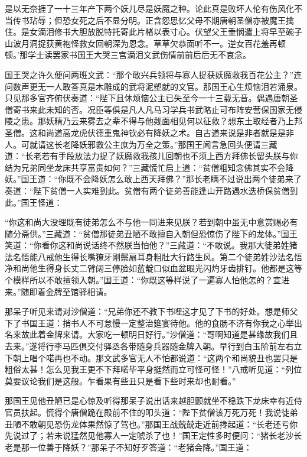 \documentclass[12pt,UTF8]{ctexbook}
\begin{document}
是以无奈捱了一十三年产下两个妖儿尽是妖魔之种。论此真是败坏人伦有伤风化不当传书玷辱；但恐女死之后不显分明。正含怨思忆父母不期唐朝圣僧亦被魔王擒住。是女滴泪修书大胆放脱特托寄此片楮以表寸心。伏望父王垂悯遣上将早至碗子山波月洞捉获黄袍怪救女回朝深为恩念。草草欠恭面听不一。逆女百花羞再顿顿。’那学士读罢家书国王大哭三宫滴泪文武伤情前前后后无不哀念。

国王哭之许久便问两班文武：“那个敢兴兵领将与寡人捉获妖魔救我百花公主？”连问数声更无一人敢答真是木雕成的武将泥塑就的文官。那国王心生烦恼泪若涌泉。只见那多官齐俯伏奏道：“陛下且休烦恼公主已失至今一十三载无音。偶遇唐朝圣僧寄书来此未知的否。况臣等俱是凡人凡马习学兵书武略止可布阵安营保国家无侵陵之患。那妖精乃云来雾去之辈不得与他觌面相见何以征救？想东土取经者乃上邦圣僧。这和尚道高龙虎伏德重鬼神钦必有降妖之术。自古道来说是非者就是是非人。可就请这长老降妖邪救公主庶为万全之策。”那国王闻言急回头便请三藏道：“长老若有手段放法力捉了妖魔救我孩儿回朝也不须上西方拜佛长留头朕与你结为兄弟同坐龙床共享富贵如何？”三藏慌忙启上道：“贫僧粗知念佛其实不会降妖。”国王道：“你既不会降妖怎么敢上西天拜佛？”那长老瞒不过说出两个徒弟来了奏道：“陛下贫僧一人实难到此。贫僧有两个徒弟善能逢山开路遇水迭桥保贫僧到此。”国王怪道：

“你这和尚大没理既有徒弟怎么不与他一同进来见朕？若到朝中虽无中意赏赐必有随分斋供。”三藏道：“贫僧那徒弟丑陋不敢擅自入朝但恐惊伤了陛下的龙体。”国王笑道：“你看你这和尚说话终不然朕当怕他？”三藏道：“不敢说。我那大徒弟姓猪法名悟能八戒他生得长嘴獠牙刚鬃扇耳身粗肚大行路生风。第二个徒弟姓沙法名悟净和尚他生得身长丈二臂阔三停脸如蓝靛口似血盆眼光闪灼牙齿排钉。他都是这等个模样所以不敢擅领入朝。”国王道：“你既这等样说了一遍寡人怕他怎的？宣进来。”随即着金牌至馆驿相请。

那呆子听见来请对沙僧道：“兄弟你还不教下书哩这才见了下书的好处。想是师父下了书国王道：捎书人不可怠慢一定整治筵宴待他。他的食肠不济有你我之心举出名来故此着金牌来请。大家吃一顿明日好行。”沙僧道：“哥啊知道是甚缘故我们且去来。”遂将行李马匹俱交付驿丞各带随身兵器随金牌入朝。早行到白玉阶前左右立下朝上唱个喏再也不动。那文武多官无人不怕都说道：“这两个和尚貌丑也罢只是粗俗太甚！怎么见我王更不下拜喏毕平身挺然而立可怪可怪！”八戒听见道：“列位莫要议论我们是这般。乍看果有些丑只是看下些时来却也耐看。”

那国王见他丑陋已是心惊及听得那呆子说出话来越胆颤就坐不稳跌下龙床幸有近侍官员扶起。慌得个唐僧跪在殿前不住的叩头道：“陛下贫僧该万死万死！我说徒弟丑陋不敢朝见恐伤龙体果然惊了驾也。”那国王战兢兢走近前搀起道：“长老还亏你先说过了；若未说猛然见他寡人一定唬杀了也！”国王定性多时便问：“猪长老沙长老是那一位善于降妖？”那呆子不知好歹答道：“老猪会降。”国王道：
\end{document}
